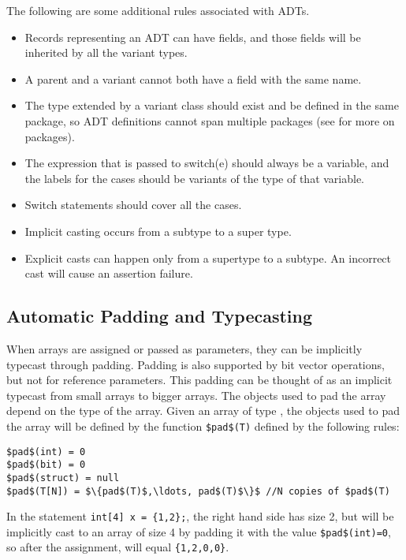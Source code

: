 The following are some additional rules associated with ADTs.
\begin{itemize}
\item Records representing an ADT can have fields, and those fields will be inherited by all the variant types.
\item A parent and a variant  cannot both have a field with the same name.
\item The type extended by a variant class should exist and be defined in the same package, so ADT definitions cannot span multiple packages (see  for more on packages).
\item The expression that is passed to switch(e) should always be a variable, and the labels for the cases should be variants of the type of that variable.
\item Switch statements should cover all the cases.
\item Implicit casting occurs from a subtype to a super type.
\item Explicit casts can happen only from a supertype to a subtype. An incorrect cast will cause an assertion failure.
\end{itemize}



\subsection{Automatic Padding and Typecasting}
When arrays are assigned or passed as parameters, they can be implicitly typecast through padding. Padding is also supported by bit vector operations, but not for reference parameters. This padding can be thought of as an implicit typecast from small arrays to bigger arrays. The objects used to pad the array depend on the type of the array. Given an array of type , the objects used to pad the array will be defined by the function \lstinline!$pad$(T)! defined by the following rules:
\begin{lstlisting}
$pad$(int) = 0
$pad$(bit) = 0
$pad$(struct) = null
$pad$(T[N]) = $\{pad$(T)$,\ldots, pad$(T)$\}$ //N copies of $pad$(T)
\end{lstlisting}

\begin{Example}
In the statement \lstinline!int[4] x = {1,2};!, the right hand side has size 2, but will be implicitly cast to an array of size 4 by padding it with the value \lstinline!$pad$(int)=0!, so after the assignment,  will equal \lstinline!{1,2,0,0}!.
\end{Example}


